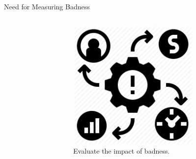 \documentclass[nobackground,dvipsnames,table]{beamer}
\begin{document}
\begin{frame}{Need for Measuring Badness}
\begin{columns}
\begin{figure}
            \end{figure}
            \begin{figure}
                \centering
                \caption{Evaluate the impact of badness.}
                \includegraphics[width=0.75\textwidth]{impact-of-badness}
            \end{figure}

    \end{columns}
\end{frame}
\end{document}
